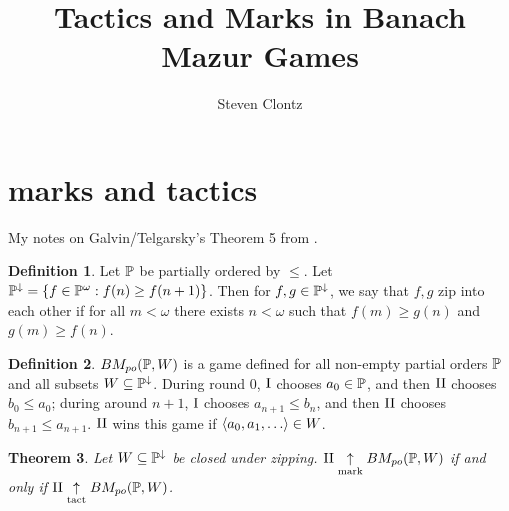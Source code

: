 \documentclass[11pt]{article}
\title{Tactics and Marks in Banach Mazur Games}
\author{Steven Clontz}
\theoremstyle{plain}
\newtheorem{theorem}{Theorem}
\theoremstyle{definition}
\newtheorem{definition}[theorem]{Definition}
\theoremstyle{remark}
\theoremstyle{plain}
\theoremstyle{definition}
\theoremstyle{remark}
\newcommand{\bmPoGame}[2]{BM_{po}(#1,#2)}
\begin{document}
\maketitle

  \section*{marks and tactics}

  My notes on Galvin/Telgarsky's Theorem 5 from \cite{MR831181}.

  \begin{definition}
    Let \(\mathbb{P}\) be partially ordered by \(\leq\).
    Let \(\mathbb{P}^{\downarrow}=\{f\in\mathbb{P}^\omega : f(n)\geq f(n+1)\}\).
    Then for \(f,g\in\mathbb{P}^\downarrow\), we say that \(f,g\) zip into each
    other if for all \(m<\omega\) there exists \(n<\omega\) such that
    \(f(m)\geq g(n)\) and \(g(m)\geq f(n)\).
  \end{definition}

  \begin{definition}
    \(\bmPoGame{\mb P}{W}\) is a game defined for all non-empty partial orders
    \(\mathbb{P}\) and all subsets \(W\subseteq\mathbb{P}^\downarrow\).
    During round \(0\), \(\mathrm{I}\) chooses \(a_0\in\mathbb{P}\),
    and then \(\mathrm{II}\) chooses \(b_0\leq a_0\); during around \(n+1\),
    \(\mathrm{I}\) chooses \(a_{n+1}\leq b_n\), and then \(\mathrm{II}\) chooses
    \(b_{n+1}\leq a_{n+1}\). \(\mathrm{II}\) wins this game if
    \(\<a_0,a_1,\dots\>\in W\).
  \end{definition}

  \begin{theorem}
    Let \(W\subseteq\mathbb{P}^\downarrow\) be closed under zipping.
    \(\plII\markwin\bmPoGame{\mb P}{W}\) if and only if
    \(\plII\tactwin\bmPoGame{\mb P}{W}\).
  \end{theorem}
\end{document}
